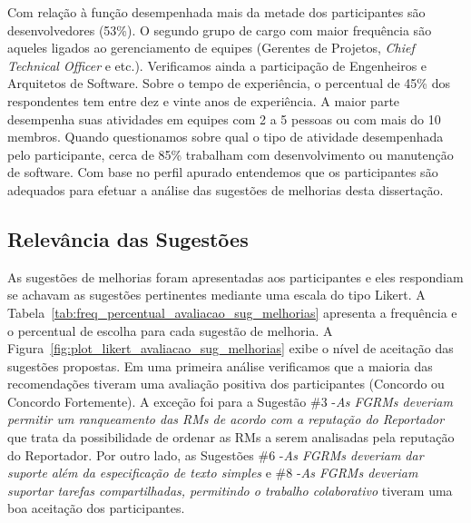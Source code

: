 Com relação à função desempenhada mais da metade dos participantes são
desenvolvedores (53\%). O segundo grupo de cargo com maior frequência são
aqueles ligados ao gerenciamento de equipes (Gerentes de Projetos,
\textit{Chief Technical Officer} e etc.). Verificamos ainda a participação de
Engenheiros e Arquitetos de Software. Sobre o tempo de experiência, o
percentual de 45\% dos respondentes tem entre dez e vinte anos de experiência.
A maior parte desempenha suas atividades em equipes com 2 a 5 pessoas ou com
mais do 10 membros. Quando questionamos sobre qual o tipo de atividade
desempenhada pelo participante, cerca de 85\% trabalham com desenvolvimento ou
manutenção de software. Com base no perfil apurado entendemos que os
participantes são adequados para efetuar a análise das sugestões de melhorias
desta dissertação.

\subsection{Relevância das Sugestões}
\label{sub:sug_melhorias_resultados_relevancia}

As sugestões de melhorias foram apresentadas aos participantes e eles
respondiam se achavam as sugestões pertinentes mediante uma escala do tipo
Likert. A Tabela~\ref{tab:freq_percentual_avaliacao_sug_melhorias} apresenta a
frequência e o percentual de escolha para cada sugestão de melhoria. A
Figura~\ref{fig:plot_likert_avaliacao_sug_melhorias} exibe o nível de aceitação
das sugestões propostas. Em uma primeira análise verificamos que a maioria das
recomendações tiveram uma avaliação positiva dos participantes (Concordo ou
Concordo Fortemente). A exceção foi para a Sugestão \#3 \@-\@ \textit{As FGRMs
    deveriam permitir um ranqueamento das RMs de acordo com a reputação do
    Reportador} que trata da possibilidade de ordenar as RMs a serem analisadas
pela reputação do Reportador. Por outro lado, as Sugestões \#6 \@-\@ \textit{As
    FGRMs deveriam dar suporte além da especificação de texto simples}  e \#8
\@-\@ \textit{As FGRMs deveriam suportar tarefas compartilhadas, permitindo o
    trabalho colaborativo}  tiveram uma boa aceitação dos participantes.


